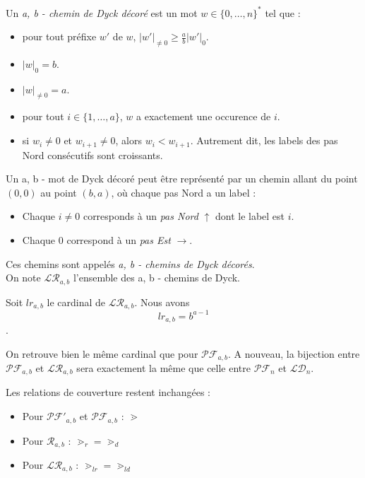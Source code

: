 \begin{definition}
    Un \emph{a, b - chemin de Dyck décoré} est un mot $w \in 
    \{0, \ldots, n\}^*$ tel que :
    \begin{itemize}
        \item pour tout préfixe $w'$ de $w$,
            $\displaystyle|w'|_{\neq 0} \geqslant \frac{a}{b}|w'|_0$.
        \item $|w|_0 = b$.
        \item $|w|_{\neq 0} = a$.
        \item pour tout $i \in \{1, \ldots, a\}$, $w$ a exactement une
            occurence de $i$.
        \item si $w_i \neq 0$ et $w_{i+1} \neq 0$,
            alors $w_i < w_{i+1}$. Autrement dit, les labels des pas Nord
            consécutifs sont croissants.
    \end{itemize}
\end{definition}

Un a, b - mot de Dyck décoré peut être représenté par un chemin allant du
point $(0,0)$ au point $(b,a)$, où chaque pas Nord a un label :
\begin{itemize}
    \item Chaque $i \neq 0$ corresponds à un \emph{pas Nord} $\uparrow$
    dont le label est $i$.
    \item Chaque $0$ correspond à un \emph{pas Est} $\rightarrow$.
\end{itemize}

Ces chemins sont appelés \emph{a, b - chemins de Dyck décorés}.\\
On note $\mathcal{LR}_{a,b}$ l'ensemble des a, b - chemins de Dyck.

\begin{theorem}
    Soit $lr_{a,b}$ le cardinal de $\mathcal{LR}_{a,b}$.
    Nous avons $$lr_{a,b} = b^{a - 1}$$.
\end{theorem}

On retrouve bien le même cardinal que pour $\mathcal{PF}_{a,b}$.
A nouveau, la bijection entre $\mathcal{PF}_{a,b}$ et $\mathcal{LR}_{a,b}$
sera exactement la même que celle entre $\mathcal{PF}_n$ et
$\mathcal{LD}_{n}$.

Les relations de couverture restent inchangées :
\begin{itemize}
    \item Pour $\mathcal{PF'}_{a,b}$ et $\mathcal{PF}_{a,b}$ : $\gtrdot$
    \item Pour $\mathcal{R}_{a,b}$ : $\gtrdot_r = \gtrdot_d$
    \item Pour $\mathcal{LR}_{a,b}$ : $\gtrdot_{lr} = \gtrdot_{ld}$ 
\end{itemize}

